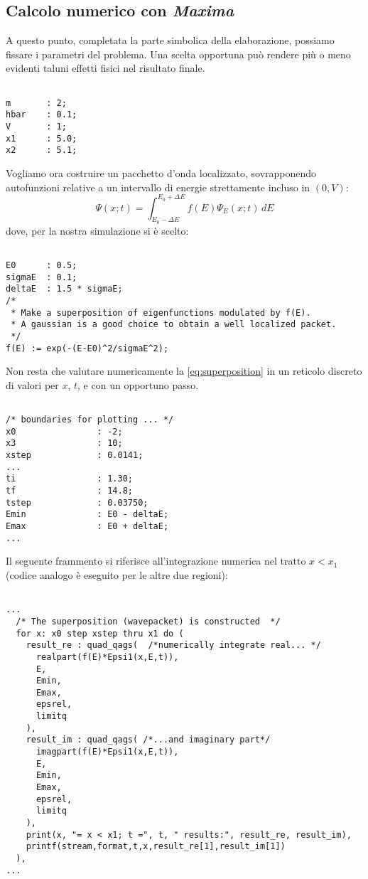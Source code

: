 \subsection{Calcolo numerico con \emph{Maxima}}\label{sec:numerica}

A questo punto, completata la parte simbolica della  
elaborazione, possiamo fissare i parametri del problema. Una scelta
opportuna può rendere più o meno evidenti taluni effetti fisici
nel risultato  finale.
\begin{lstlisting}

m       : 2;
hbar    : 0.1;
V       : 1;
x1      : 5.0;
x2      : 5.1;
\end{lstlisting}

Vogliamo ora costruire un pacchetto d'onda localizzato,
sovrapponendo autofunzioni relative a un intervallo di energie
strettamente incluso in $(0,V)$: 
\begin{equation}
\Psi(x;t) = \int_{E_0-\Delta E}^{E_0+\Delta E} f(E) \Psi_E(x;t)\,dE 
\label{eq:superposition}
\end{equation}
dove, per la nostra simulazione si è scelto:
\begin{lstlisting}

E0      : 0.5;
sigmaE  : 0.1;
deltaE  : 1.5 * sigmaE;
/* 
 * Make a superposition of eigenfunctions modulated by f(E). 
 * A gaussian is a good choice to obtain a well localized packet.
 */
f(E) := exp(-(E-E0)^2/sigmaE^2);
\end{lstlisting}

Non resta che valutare numericamente la \eqref{eq:superposition}
in un reticolo discreto di valori per $x$, $t$, e con un opportuno passo.
\begin{lstlisting}

/* boundaries for plotting ... */
x0                : -2;
x3                : 10;
xstep             : 0.0141;
... 
ti                : 1.30;
tf                : 14.8;
tstep             : 0.03750;
Emin              : E0 - deltaE;
Emax              : E0 + deltaE;
...

\end{lstlisting}
Il seguente frammento si riferisce all'integrazione numerica
nel tratto $x<x_1$ (codice analogo è eseguito per le altre due
regioni):
\begin{lstlisting}

...
  /* The superposition (wavepacket) is constructed  */
  for x: x0 step xstep thru x1 do (
    result_re : quad_qags(  /*numerically integrate real... */
      realpart(f(E)*Epsi1(x,E,t)),
      E,
      Emin,
      Emax,
      epsrel,
      limitq
    ),
    result_im : quad_qags( /*...and imaginary part*/
      imagpart(f(E)*Epsi1(x,E,t)),
      E,
      Emin,
      Emax,
      epsrel,
      limitq
    ), 
    print(x, "= x < x1; t =", t, " results:", result_re, result_im),
    printf(stream,format,t,x,result_re[1],result_im[1])
  ),
...
\end{lstlisting}

